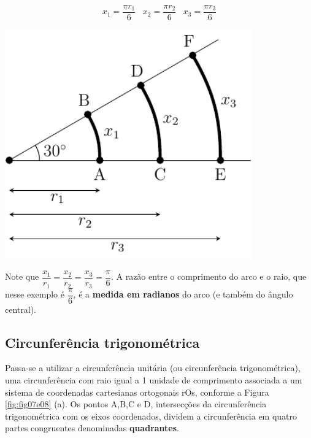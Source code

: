 \begin{minipage}{5cm}
    \[
    x_1=\dfrac{\pi r_1}{6} \;\;\; x_2=\dfrac{\pi r_2}{6} \;\;\; x_3=\dfrac{\pi r_3}{6}
    \]
\end{minipage}
\hfill
\begin{minipage}{8cm}
        \centering
            \includegraphics[width=0.8\textwidth]{Imagens/fig06.pdf}
            \label{fig:fig06}
\end{minipage}

\vspace{1cm}
Note que $\dfrac{x_1}{r_1}=\dfrac{x_2}{r_2}=\dfrac{x_3}{r_3}=\dfrac{\pi}{6}$. A razão entre o comprimento do arco e o raio, que nesse exemplo é $\dfrac{\pi}{6}$, é a \textbf{medida em radianos} do arco (e também do ângulo central).

\subsection{Circunferência trigonométrica}
Passa-se a utilizar a circunferência unitária (ou circunferência trigonométrica), uma circunferência com raio igual a 1 unidade de comprimento associada a um sistema de coordenadas cartesianas ortogonais rOs, conforme a Figura \ref{fig:fig07e08} (a). Os pontos A,B,C e D, intersecções da circunferência trigonométrica com os eixos coordenados, dividem a circunferência em quatro partes congruentes denominadas \textbf{quadrantes}.

